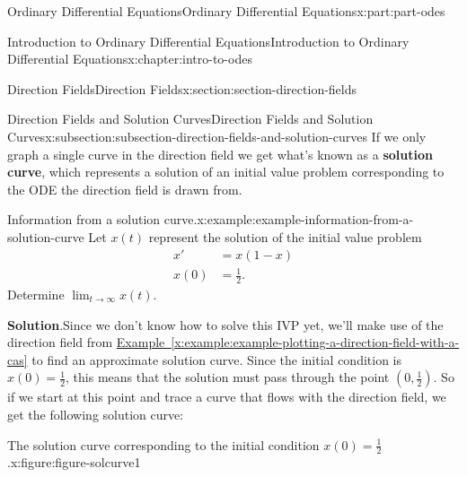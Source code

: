 \documentclass[twoside,10pt,]{book}
\newcommand{\blocktitlefont}{\relax}
\newcommand{\xreffont}{\relax}
\newcommand{\terminology}[1]{\textbf{#1}}
\numberwithin{equation}{part}
\begin{document}
\begin{partptx}{Ordinary Differential Equations}{}{Ordinary Differential Equations}{}{}{x:part:part-odes}
\begin{chapterptx}{Introduction to Ordinary Differential Equations}{}{Introduction to Ordinary Differential Equations}{}{}{x:chapter:intro-to-odes}
\begin{sectionptx}{Direction Fields}{}{Direction Fields}{}{}{x:section:section-direction-fields}
\begin{subsectionptx}{Direction Fields and Solution Curves}{}{Direction Fields and Solution Curves}{}{}{x:subsection:subsection-direction-fields-and-solution-curves}
If we only graph a single curve in the direction field we get what's known as a \terminology{solution curve}, which represents a solution of an initial value problem corresponding to the ODE the direction field is drawn from.%
\begin{example}{Information from a solution curve.}{x:example:example-information-from-a-solution-curve}%
Let \(x(t)\) represent the solution of the initial value problem%
\begin{align*}
x' & = x(1-x) \\
x(0) & = \frac{1}{2}. 
\end{align*}
Determine \(\lim_{t\to\infty}x(t)\).%
\par\smallskip%
\noindent\textbf{\blocktitlefont Solution}.\hypertarget{g:solution:idp105548816363680}{}\quad{}Since we don't know how to solve this IVP yet, we'll make use of the direction field from \hyperref[x:example:example-plotting-a-direction-field-with-a-cas]{Example~{\xreffont\ref{x:example:example-plotting-a-direction-field-with-a-cas}}} to find an approximate solution curve. Since the initial condition is \(x(0) = \frac{1}{2}\), this means that the solution must pass through the point \((0,\frac{1}{2})\). So if we start at this point and trace a curve that flows with the direction field, we get the following solution curve:%
\begin{figureptx}{The solution curve corresponding to the initial condition \(x(0) = \frac{1}{2}\).}{x:figure:figure-solcurve1}{}%
\begin{image}{0.25}{0.5}{0.25}%

\end{image}
\end{figureptx}
\end{example}
\end{subsectionptx}
\end{sectionptx}
\end{chapterptx}
\end{partptx}
\end{document}
